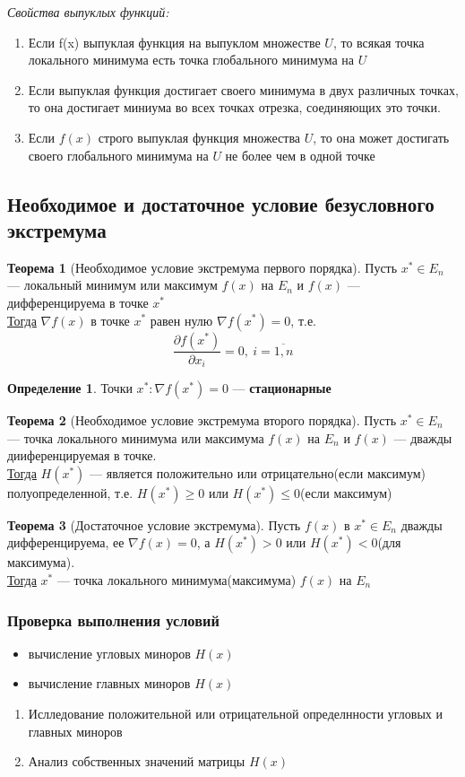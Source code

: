 \documentclass[english]{article}
\theoremstyle{plain}
\theoremstyle{remark}
\theoremstyle{definition}
\newtheorem{theorem}{Теорема}[section]
\newtheorem*{definition}{Определение}
\begin{document}
\emph{Свойства выпуклых функций:}
\begin{enumerate}
\item Если f(x) выпуклая функция на выпуклом множестве \(U\), то всякая точка локального минимума есть точка глобального минимума на \(U\)
\item Если выпуклая функция достигает своего минимума в двух различных точках, то она достигает миниума во всех точках отрезка, соединяющих это точки.
\item Если \(f(x)\) строго выпуклая функция множества \(U\), то она может достигать своего глобального минимума на \(U\) не более чем в одной точке
\end{enumerate}
\subsection{Необходимое и достаточное условие безусловного экстремума}
\label{sec:org4c6103d}
\begin{theorem}[Необходимое условие экстремума первого порядка]
Пусть \(x^* \in E_n\) --- локальный минимум или максимум \(f(x)\) на \(E_n\) и \(f(x)\) --- дифференцируема в точке \(x^*\) \\
\uline{Тогда} \(\nabla f(x)\) в точке \(x^*\) равен нулю \(\nabla f(x^*) = 0\), т.е.
\[ \frac{\partial f(x^*)}{\partial x_i} = 0,\ i = \overline{1, n} \]
\end{theorem}
\begin{definition}
Точки \(x^*: \nabla f(x^*) = 0\) --- \textbf{стационарные}
\end{definition}
\begin{theorem}[Необходимое условие экстремума второго порядка]
Пусть \(x^* \in E_n\) --- точка локального минимума или максимума \(f(x)\) на \(E_n\) и \(f(x)\) --- дважды дииференцируемая в точке. \\
\uline{Тогда} \(H(x^*)\) --- является положительно или отрицательно(если максимум) полуопределенной, т.е. \(H(x^*) \ge 0\) или \(H(x^*) \le 0\)(если максимум)
\end{theorem}
\begin{theorem}[Достаточное условие экстремума]
Пусть \(f(x)\) в \(x^* \in E_n\) дважды дифференцируема, ее \(\nabla f(x) = 0\), а \(H(x^*) > 0\) или \(H(x^*) < 0\)(для максимума). \\
\uline{Тогда} \(x^*\) --- точка локального минимума(максимума) \(f(x)\) на \(E_n\)
\end{theorem}
\subsubsection{Проверка выполнения условий}
\label{sec:orgfc78a8e}
\begin{itemize}
\item вычисление угловых миноров \(H(x)\)
\item вычисление главных миноров \(H(x)\) \\
\end{itemize}


\begin{enumerate}
\item Ислледование положительной или отрицательной определнности угловых и главных миноров
\item Анализ собственных значений матрицы \(H(x)\)
\end{enumerate}
\end{document}
